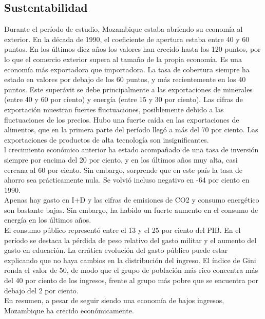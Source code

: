     \subsection{Sustentabilidad}
    Durante el período de estudio, Mozambique estaba abriendo su economía al exterior. En la década de 1990, el coeficiente de apertura estaba entre 40 y 60 puntos. En los últimos diez años los valores han crecido hasta los 120 puntos, por lo que el comercio exterior supera al tamaño de la propia economía. Es una economía más exportadora que importadora. La tasa de cobertura siempre ha estado en valores por debajo de los 60 puntos, y más recientemente en los 40 puntos. Este superávit se debe principalmente a las exportaciones de minerales (entre 40 y 60 por ciento) y energía (entre 15 y 30 por ciento). Las cifras de exportación muestran fuertes fluctuaciones, posiblemente debido a las fluctuaciones de los precios. Hubo una fuerte caída en las exportaciones de alimentos, que en la primera parte del período llegó a más del 70 por ciento. Las exportaciones de productos de alta tecnología son insignificantes.\\
    l crecimiento económico anterior ha estado acompañado de una tasa de inversión siempre por encima del 20 por ciento, y en los últimos años muy alta, casi cercana al 60 por ciento. Sin embargo, sorprende que en este país la tasa de ahorro sea prácticamente nula. Se volvió incluso negativo en -64 por ciento en 1990.\\
    Apenas hay gasto en I+D y las cifras de emisiones de CO2 y consumo energético son bastante bajas. Sin embargo, ha habido un fuerte aumento en el consumo de energía en los últimos años.\\
    El consumo público representó entre el 13 y el 25 por ciento del PIB. En el período se destaca la pérdida de peso relativo del gasto militar y el aumento del gasto en educación. La errática evolución del gasto público puede estar explicando que no haya cambios en la distribución del ingreso. El índice de Gini ronda el valor de 50, de modo que el grupo de población más rico concentra más del 40 por ciento de los ingresos, frente al grupo más pobre que se encuentra por debajo del 2 por ciento.\\
    En resumen, a pesar de seguir siendo una economía de bajos ingresos, Mozambique ha crecido económicamente.


